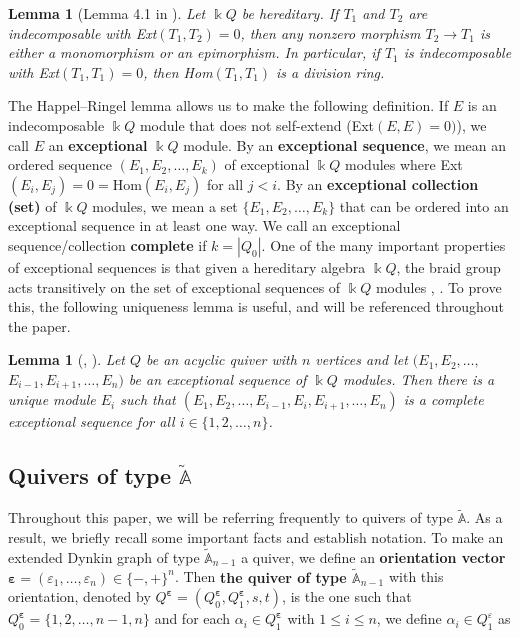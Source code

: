 \documentclass[12pt]{amsart}
\theoremstyle{plain}
\newtheorem{lem}[thm]{Lemma}
\theoremstyle{definition}
\theoremstyle{remark}
\begin{document}
\begin{lem}[Lemma 4.1 in \cite{happel1982tilted}]\label{lem: Happel-Ringel Lemma}
    Let $\Bbbk Q$ be hereditary. If $T_1$ and $T_2$ are indecomposable with Ext$(T_1,T_2) = 0$, then any nonzero morphism $T_2 \rightarrow T_1$ is either a monomorphism or an epimorphism. In particular, if $T_1$ is indecomposable with Ext$(T_1,T_1) = 0$, then Hom$(T_1,T_1)$ is a division ring. 
\end{lem}

The Happel--Ringel lemma allows us to make the following definition. If $E$ is an indecomposable $\Bbbk Q$ module that does not self-extend (Ext$(E,E)= 0)$), we call $E$ an \textbf{exceptional} $\Bbbk Q$ module. By an \textbf{exceptional sequence}, we mean an ordered sequence $(E_1, E_2, \dots, E_k)$ of exceptional $\Bbbk Q$ modules where Ext$(E_i,E_j) = 0 =  \text{Hom}(E_i,E_j)$ for all $j < i$. By an \textbf{exceptional collection (set)} of $\Bbbk Q$ modules, we mean a set $\{E_1, E_2, \dots, E_k\}$ that can be ordered into an exceptional sequence in at least one way. We call an exceptional sequence/collection \textbf{complete} if $k = |Q_0|$. One of the many important properties of exceptional sequences is that given a hereditary algebra $\Bbbk Q$, the braid group acts transitively on the set of exceptional sequences of $\Bbbk Q$ modules \cite{crawley1992exceptional}, \cite{ringel1994braid}. To prove this, the following {uniqueness} lemma is useful{, and will be {\color{black} referenced} throughout the paper.}

\begin{lem}[\cite{crawley1992exceptional}, \cite{ringel1994braid}] \label{lem: uniqueness in exceptional sequence}
    Let $Q$ be an acyclic quiver with $n$ vertices and let $(E_1, E_2, \dots, $ $E_{i-1}, E_{i+1}, \dots, E_n)$ be an exceptional sequence of $\Bbbk Q$ modules. Then there is a unique module $E_i$ such that $(E_1, E_2, \dots, E_{i-1}, E_i, E_{i+1}, \dots, E_n)$ is a complete exceptional sequence for all $i \in \{1,2,\dots,n\}$.
\end{lem}


\subsection{Quivers of type $\tilde{\mathbb{A}}$}

Throughout this paper, we will be referring frequently to quivers of type $\tilde{\mathbb{A}}$. As a result, we briefly recall some important facts and establish notation. To make an extended Dynkin graph of type $\tilde{\mathbb{A}}_{n-1}$ a quiver, we define an \textbf{orientation vector} $\bm{\varepsilon} = (\varepsilon_1, \dots , \varepsilon_{n}) \in \{-,+\}^{n}$. Then \textbf{the quiver of type $\tilde{\mathbb{A}}_{n-1}$} with this orientation, denoted by $Q^{\bm{\varepsilon}} = (Q_0^{\bm{\varepsilon}},Q_1^{\bm{\varepsilon}},s,t)$, is the one such that $Q_0^{\bm{\varepsilon}} = \{1,2,\dots,n-1,n\}$ and for each $\alpha_i \in Q_1^{\bm{\varepsilon}}$ with $1\leq i \leq n$, we define $\alpha_i \in Q^{\varepsilon}_1$ as
\end{document}
